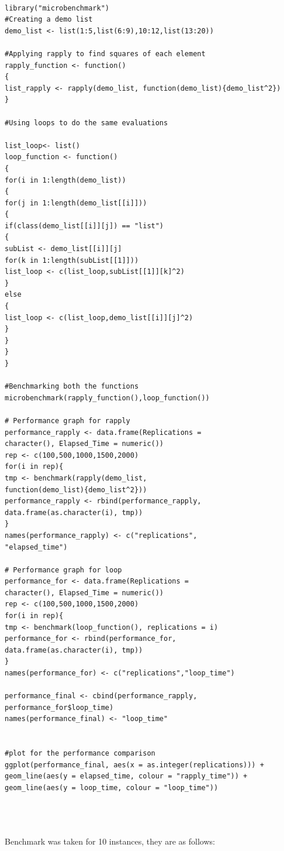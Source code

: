 \documentclass{article}
\begin{document}
\begin{lstlisting}
	
library("microbenchmark")
#Creating a demo list
demo_list <- list(1:5,list(6:9),10:12,list(13:20))

#Applying rapply to find squares of each element
rapply_function <- function()
{
list_rapply <- rapply(demo_list, function(demo_list){demo_list^2})
}

#Using loops to do the same evaluations

list_loop<- list()
loop_function <- function()
{
for(i in 1:length(demo_list))
{
for(j in 1:length(demo_list[[i]]))
{
if(class(demo_list[[i]][j]) == "list")
{
subList <- demo_list[[i]][j]
for(k in 1:length(subList[[1]]))
list_loop <- c(list_loop,subList[[1]][k]^2)
}
else
{
list_loop <- c(list_loop,demo_list[[i]][j]^2)
}
}
}
}

#Benchmarking both the functions
microbenchmark(rapply_function(),loop_function())

# Performance graph for rapply
performance_rapply <- data.frame(Replications = 
character(), Elapsed_Time = numeric())
rep <- c(100,500,1000,1500,2000)
for(i in rep){
tmp <- benchmark(rapply(demo_list, 
function(demo_list){demo_list^2}))
performance_rapply <- rbind(performance_rapply, 
data.frame(as.character(i), tmp))
}
names(performance_rapply) <- c("replications",
"elapsed_time")

# Performance graph for loop
performance_for <- data.frame(Replications = 
character(), Elapsed_Time = numeric())
rep <- c(100,500,1000,1500,2000)
for(i in rep){
tmp <- benchmark(loop_function(), replications = i)
performance_for <- rbind(performance_for, 
data.frame(as.character(i), tmp))
}
names(performance_for) <- c("replications","loop_time")

performance_final <- cbind(performance_rapply, 
performance_for$loop_time)
names(performance_final) <- "loop_time"


#plot for the performance comparison
ggplot(performance_final, aes(x = as.integer(replications))) + 
geom_line(aes(y = elapsed_time, colour = "rapply_time")) + 
geom_line(aes(y = loop_time, colour = "loop_time"))


	
\end{lstlisting}
	Benchmark was taken for 10 instances, they are as follows:
\end{document}
